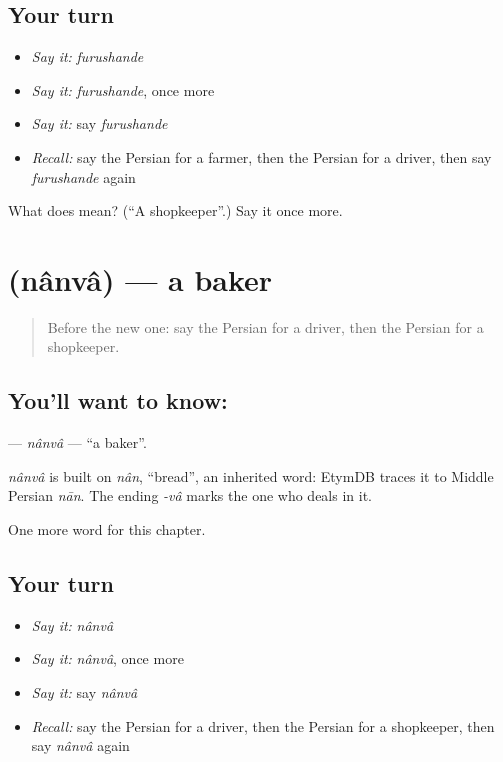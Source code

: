 \subsection*{Your turn}
\begin{itemize}
\raggedright
  \item \emph{Say it:} \emph{furushande}
  \item \emph{Say it:} \emph{furushande}, once more
  \item \emph{Say it:} say \emph{furushande}
  \item \emph{Recall:} say the Persian for a farmer, then the Persian for a driver, then say \emph{furushande} again
\end{itemize}

\begin{tcolorbox}[breakable,colback=teal!4,colframe=teal!35!black,title={Before you move on}]
What does  mean? (\textquotedblleft{}A shopkeeper\textquotedblright{}.) Say it once more.
\end{tcolorbox}
\section[\texorpdfstring{\fa{نانوا} (nânvâ)}{نانوا (nânvâ)}]{ (nânvâ) — a baker}

\label{lesson:FA-C116-nanva}



\begin{quote}
Before the new one: say the Persian for a driver, then the Persian for a shopkeeper.
\end{quote}

\subsection*{You'll want to know: }
\textbf{} — \emph{nânvâ} — \textquotedblleft{}a baker\textquotedblright{}.

\begin{cousinweb}
\emph{nânvâ} is built on \emph{nân}, \textquotedblleft{}bread\textquotedblright{}, an inherited word: EtymDB traces it to Middle Persian \emph{nān}. The ending \emph{-vâ} marks the one who deals in it.
\end{cousinweb}

\begin{grammarlens}[title={What you've built}]
One more word for this chapter.
\end{grammarlens}

\subsection*{Your turn}
\begin{itemize}
\raggedright
  \item \emph{Say it:} \emph{nânvâ}
  \item \emph{Say it:} \emph{nânvâ}, once more
  \item \emph{Say it:} say \emph{nânvâ}
  \item \emph{Recall:} say the Persian for a driver, then the Persian for a shopkeeper, then say \emph{nânvâ} again
\end{itemize}

